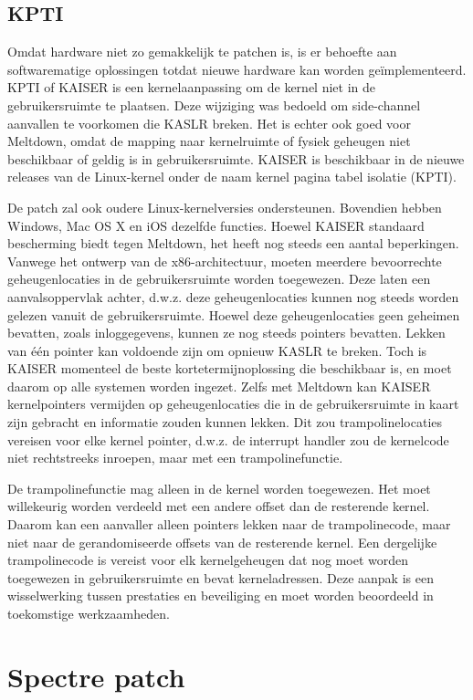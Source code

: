 \subsection{KPTI}
Omdat hardware niet zo gemakkelijk te patchen is, is er behoefte aan
softwarematige oplossingen totdat nieuwe hardware kan worden geïmplementeerd.
KPTI of KAISER is een kernelaanpassing
om de kernel niet in de gebruikersruimte te plaatsen.
Deze wijziging was bedoeld om side-channel aanvallen te voorkomen
die KASLR breken. Het is echter ook
goed voor Meltdown, omdat de mapping naar kernelruimte of fysiek geheugen niet beschikbaar of geldig is 
in gebruikersruimte. KAISER is beschikbaar in de nieuwe
releases van de Linux-kernel onder de naam kernel
pagina tabel isolatie (KPTI). 

De patch zal ook
oudere Linux-kernelversies ondersteunen. Bovendien hebben Windows, Mac OS X en iOS dezelfde functies.
Hoewel KAISER standaard bescherming biedt tegen
Meltdown, het heeft nog steeds een aantal beperkingen. Vanwege het ontwerp
van de x86-architectuur, moeten meerdere bevoorrechte geheugenlocaties
in de gebruikersruimte worden toegewezen. Deze
laten een aanvalsoppervlak achter, d.w.z. deze
geheugenlocaties kunnen nog steeds worden gelezen vanuit de gebruikersruimte. 
Hoewel deze geheugenlocaties geen geheimen bevatten,
zoals inloggegevens, kunnen ze nog steeds pointers bevatten.
Lekken van één pointer kan voldoende zijn om opnieuw KASLR te breken.
Toch is KAISER momenteel de beste kortetermijnoplossing die
beschikbaar is, en moet daarom op alle systemen worden ingezet. Zelfs met Meltdown kan KAISER kernelpointers
vermijden op geheugenlocaties
die in de gebruikersruimte in kaart zijn gebracht en informatie zouden kunnen lekken. Dit zou 
trampolinelocaties vereisen voor elke kernel pointer, d.w.z.
de interrupt handler zou de kernelcode niet rechtstreeks inroepen,
maar met een trampolinefunctie.

De trampolinefunctie mag alleen in de kernel worden toegewezen. Het moet
willekeurig worden  verdeeld met een andere offset dan de resterende
kernel. Daarom kan een aanvaller alleen pointers lekken
naar de trampolinecode, maar niet naar de gerandomiseerde offsets van
de resterende kernel. Een dergelijke trampolinecode is vereist
voor elk kernelgeheugen dat nog moet worden toegewezen in
gebruikersruimte en bevat kerneladressen. Deze aanpak 
is een wisselwerking tussen prestaties en beveiliging en
moet worden beoordeeld in toekomstige werkzaamheden.

\section{Spectre patch}
